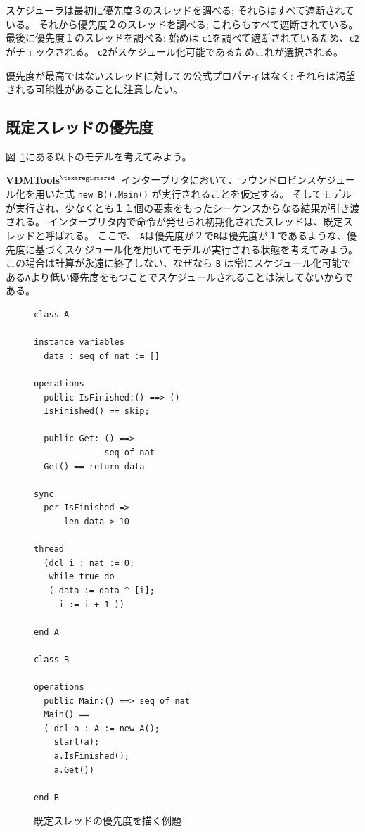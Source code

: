\documentclass[\pformat,12pt]{jreport}
\newcommand{\vdmtools}{\textbf{VDMTools}$^{\mathbf{{\textregistered}}}$}
\begin{document}
スケジューラは最初に優先度３のスレッドを調べる; それらはすべて遮断されている。
それから優先度２のスレッドを調べる; これらもすべて遮断されている。
最後に優先度１のスレッドを調べる: 始めは \texttt{c1}を調べて遮断されているため、\texttt{c2} がチェックされる。
 \texttt{c2}がスケジュール化可能であるためこれが選択される。

優先度が最高ではないスレッドに対しての公式プロパティはなく: それらは渇望される可能性があることに注意したい。

\subsection{既定スレッドの優先度}

 図~\ref{fig:priodefault}にある以下のモデルを考えてみよう。

 \vdmtools\ インタープリタにおいて、ラウンドロビンスケジュール化を用いた式 \texttt{new B().Main()} が実行されることを仮定する。
そしてモデルが実行され、少なくとも１１個の要素をもったシーケンスからなる結果が引き渡される。
インタープリタ内で命令が発せられ初期化されたスレッドは、既定スレッドと呼ばれる。
ここで、 \texttt{A}は優先度が２で\texttt{B}は優先度が１であるような、優先度に基づくスケジュール化を用いてモデルが実行される状態を考えてみよう。
この場合は計算が永遠に終了しない、なぜなら \texttt{B} は常にスケジュール化可能である\texttt{A}より低い優先度をもつことでスケジュールされることは決してないからである。

\begin{figure}
\begin{lstlisting}
class A

instance variables
  data : seq of nat := []

operations
  public IsFinished:() ==> ()
  IsFinished() == skip;

  public Get: () ==>
              seq of nat
  Get() == return data

sync
  per IsFinished =>
      len data > 10

thread
  (dcl i : nat := 0;
   while true do
   ( data := data ^ [i];
     i := i + 1 ))

end A

class B

operations
  public Main:() ==> seq of nat
  Main() ==
  ( dcl a : A := new A();
    start(a);
    a.IsFinished();
    a.Get())

end B
\end{lstlisting}
\caption{既定スレッドの優先度を描く例題\label{fig:priodefault}}
\end{figure}
\end{document}
